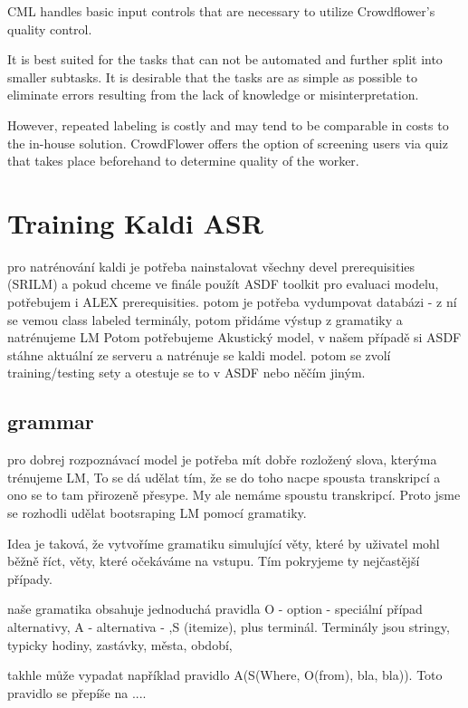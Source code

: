 CML handles basic input controls that are necessary to utilize Crowdflower's quality control. %

It is best suited for the tasks that can not be automated and further split into smaller subtasks.
It is desirable that the tasks are as simple as possible to eliminate errors resulting from the lack of knowledge or misinterpretation.

However, repeated labeling is costly and may tend to be comparable in costs to the in-house solution.
CrowdFlower offers the option of screening users via quiz that takes place beforehand to determine quality of the worker.


\section{Training Kaldi ASR}

pro natrénování kaldi je potřeba nainstalovat všechny devel prerequisities (SRILM) a pokud chceme ve finále použít ASDF toolkit pro evaluaci modelu, potřebujem i ALEX prerequisities. potom je potřeba vydumpovat databázi - z ní se vemou class labeled terminály, potom přidáme výstup z gramatiky a natrénujeme LM Potom potřebujeme Akustický model, v našem případě si ASDF stáhne aktuální ze serveru a natrénuje se kaldi model. potom se zvolí training/testing sety a otestuje se to v ASDF nebo něčím jiným.

\subsection{grammar}

pro dobrej rozpoznávací model je potřeba mít dobře rozložený slova, kterýma trénujeme LM, To se dá udělat tím, že se do toho nacpe spousta transkripcí a ono se to tam přirozeně přesype. My ale nemáme spoustu transkripcí. Proto jsme se rozhodli udělat bootsraping LM pomocí gramatiky.

Idea je taková, že vytvoříme gramatiku simulující věty, které by uživatel mohl běžně říct, věty, které očekáváme na vstupu. Tím pokryjeme ty nejčastější případy.

naše gramatika obsahuje jednoduchá pravidla O - option - speciální případ alternativy, A - alternativa - ,S (itemize), plus terminál.
Terminály jsou stringy, typicky hodiny, zastávky, města, období, 

takhle může vypadat například pravidlo A(S(Where, O(from), bla, bla)). 
Toto pravidlo se přepíše na .... 

